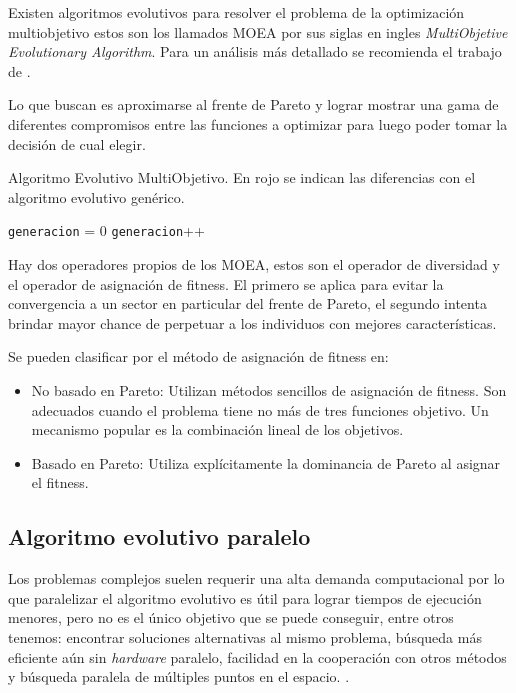 Existen algoritmos evolutivos para resolver el problema de la optimización multiobjetivo estos son los llamados MOEA por sus siglas en ingles \emph{ MultiObjetive Evolutionary Algorithm}. Para un análisis más detallado se recomienda el trabajo de \citet{Deb2001}.

Lo que buscan es aproximarse al frente de Pareto y lograr mostrar una gama de diferentes compromisos entre las funciones a optimizar para luego poder tomar la decisión de cual elegir.


\begin{algorithm}%
	\caption{Algoritmo Evolutivo MultiObjetivo. En rojo se indican las diferencias con el algoritmo evolutivo genérico.}
	\label{alg:algoritmo_genetico_multiobjetivo}
	\begin{algorithmic} [1] 
		{
			\STATE \texttt{generacion} = 0
			\STATE {\textcolor{red}{Operador Diversidad (Pob(generacion))}}
			\STATE {\textcolor{red}{Asignar Fitness (Pob(generacion))}}
			\STATE \texttt{generacion}++
			\ENDWHILE
			\RETURN 	{\textcolor{red}{Frente de Pareto}}
		}
	\end{algorithmic}
\end{algorithm}

Hay dos operadores propios de los MOEA, estos son el operador de diversidad y el operador de asignación de fitness. El primero se aplica para evitar la convergencia a un sector en particular del frente de Pareto, el segundo intenta brindar mayor chance de perpetuar a los individuos con mejores características.

Se pueden clasificar por el método de asignación de fitness en:
\begin{itemize}
	\item No basado en Pareto: Utilizan métodos sencillos de asignación de fitness. Son adecuados cuando el problema tiene no más de tres funciones objetivo. Un mecanismo popular es la combinación lineal de los objetivos.
	\item Basado en Pareto: Utiliza explícitamente la dominancia de Pareto al asignar el fitness.
\end{itemize}



\subsection{Algoritmo evolutivo paralelo}
Los problemas complejos suelen requerir una alta demanda computacional por lo que paralelizar el algoritmo evolutivo es útil para lograr tiempos de ejecución menores, pero no es el único objetivo que se puede conseguir, entre otros tenemos:  encontrar soluciones alternativas al mismo problema, búsqueda más eficiente aún sin \emph{hardware} paralelo, facilidad en la cooperación con otros métodos y búsqueda paralela de múltiples puntos en el espacio. \citep{Alba2002}. 


